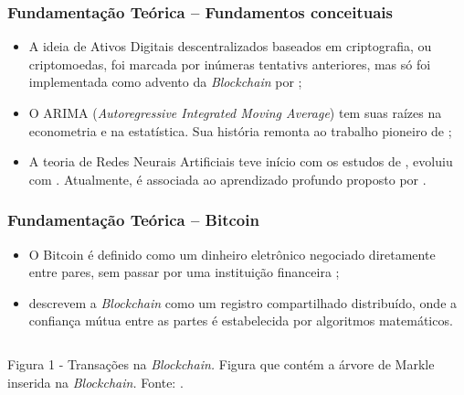 \documentclass[aspectratio=169]{beamer}
\begin{document}
\begin{frame}[fragile] \frametitle{Fundamentação Teórica -- Fundamentos conceituais}
	\begin{itemize} \itemsep1em
		\item A ideia de Ativos Digitais descentralizados baseados em criptografia, ou criptomoedas, foi marcada por inúmeras tentativs anteriores, mas só foi implementada como advento da \textit{Blockchain} por \textcite{Nakamoto} \cite{Moi};
		\item O ARIMA (\textit{Autoregressive Integrated Moving Average}) tem suas raízes na econometria e na estatística. Sua história remonta ao trabalho pioneiro de \textcite{Box};
		\item A teoria de Redes Neurais Artificiais teve início com os estudos de \textcite{Rosenblatt}, evoluiu com \textcite{Rumelhart}. Atualmente, é associada ao aprendizado profundo proposto por \textcite{Good}.
	\end{itemize}
\end{frame}

\begin{frame}[fragile] 
    \frametitle{Fundamentação Teórica -- Bitcoin}
    \begin{itemize}
		\item O Bitcoin é definido como um dinheiro eletrônico negociado diretamente entre pares, sem passar por uma instituição financeira \cite{Nakamoto};
		\item \textcite{Yuan} descrevem a \textit{Blockchain} como um registro compartilhado distribuído, onde a confiança mútua entre as partes é estabelecida por algoritmos matemáticos.
	\end{itemize}

	\begin{columns}[c]
		\begin{column}{1\linewidth}
			\begin{figure}
				\label{fig:blockchain}
			\end{figure}

			\begin{block}{Figura 1 - Transações na \textit{Blockchain.}}
				Figura que contém a árvore de Markle inserida na \textit{Blockchain.} \newline Fonte: \cite{Nakamoto}.    
			\end{block}
		\end{column}
	\end{columns}
\end{frame}
\end{document}
